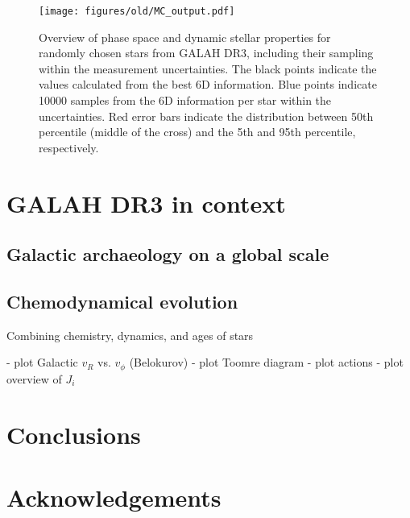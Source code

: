\documentclass[fleqn,usenatbib,useAMS]{mnras}
\begin{document}
\begin{figure}
\centering
\texttt{[image: figures/old/MC\_output.pdf]}
  \caption[{Overview of phase space and dynamic stellar properties for randomly chosen stars from GALAH DR3, including their sampling within the measurement uncertainties.}]{Overview of phase space and dynamic stellar properties for randomly chosen stars from GALAH DR3, including their sampling within the measurement uncertainties. The black points indicate the values calculated from the best 6D information. Blue points indicate 10000 samples from the 6D information per star within the uncertainties. Red error bars indicate the distribution between 50th percentile (middle of the cross) and the 5th and 95th percentile, respectively.}
  \label{fig:MC_output}
\end{figure}

\section{GALAH DR3 in context} \label{sec:galah_in_context}

\subsection{Galactic archaeology on a global scale}  \label{sec:global_ga}

\subsection{Chemodynamical evolution}  \label{sec:cde}

Combining chemistry, dynamics, and ages of stars

- plot Galactic $v_R$ vs. $v_\phi$ (Belokurov)
- plot Toomre diagram
- plot actions
- plot \cite{Vasiliev2019} overview of $J_i$

\section{Conclusions} \label{sec:conclusions}


\section*{Acknowledgements}
\end{document}
